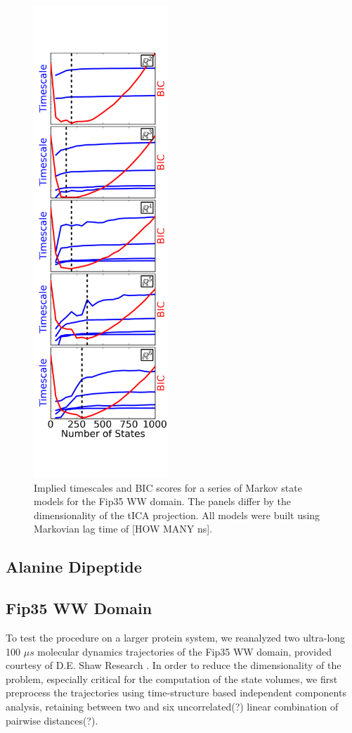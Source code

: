 \documentclass[twocolumn,floatfix,nofootinbib,aps]{revtex4-1}
\begin{document}
\begin{figure}
\centering
\includegraphics[width=2in]{figs/ww_bic_vs_eval_slide_nscounts.png}
\caption{Implied timescales and BIC scores for a series of Markov state models for the Fip35 WW domain. The panels differ by the dimensionality of the tICA projection. All models were built using Markovian lag time of [HOW MANY ns].}
\label{fig:ww}
\end{figure}

\subsection{Alanine Dipeptide}

\subsection{Fip35 WW Domain}

To test the procedure on a larger protein system, we reanalyzed two ultra-long 100 $\mu s$ molecular dynamics trajectories of the Fip35 WW domain\cite{Liu2008Experimental}, provided courtesy of D.E. Shaw Research \cite{}. In order to reduce the dimensionality of the problem, especially critical for the computation of the state volumes, we first preprocess the trajectories using time-structure based independent components analysis, retaining between two and six uncorrelated(?) linear combination of pairwise distances(?).
\end{document}
